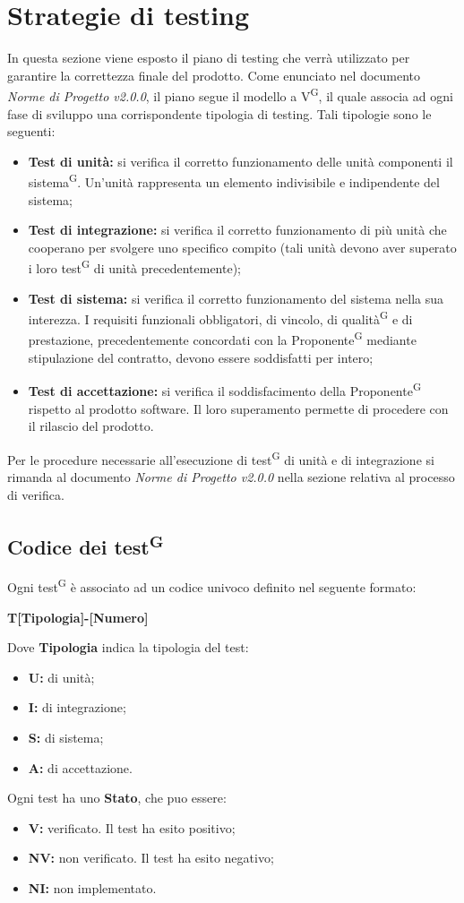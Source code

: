 \documentclass[8pt]{article}
\newcommand{\glossterm}[1]{#1\textsuperscript{G}} %
\begin{document}
\section{Strategie di testing}\label{sec:strategie testing}
In questa sezione viene esposto il piano di testing che verrà utilizzato per garantire la correttezza finale del prodotto. Come enunciato nel documento \textit{Norme di Progetto v2.0.0}, il piano segue il \glossterm{modello a V}, il quale associa ad ogni fase di sviluppo una corrispondente tipologia di testing. Tali tipologie sono le seguenti:
\begin{itemize}
	\item \textbf{Test di unità:} si verifica il corretto funzionamento delle unità componenti il \glossterm{sistema}. Un'unità rappresenta un elemento indivisibile e indipendente del sistema; 
	\item \textbf{Test di integrazione:} si verifica il corretto funzionamento di più unità che cooperano per svolgere uno specifico compito (tali unità devono aver superato i loro \glossterm{test} di unità precedentemente);
	\item \textbf{Test di sistema:} si verifica il corretto funzionamento del sistema nella sua interezza. I requisiti funzionali obbligatori, di vincolo, di \glossterm{qualità} e di prestazione, precedentemente concordati con la \glossterm{Proponente} mediante stipulazione del contratto, devono essere soddisfatti per intero;
	\item \textbf{Test di accettazione:} si verifica il soddisfacimento della \glossterm{Proponente} rispetto al prodotto software. Il loro superamento permette di procedere con il rilascio del prodotto.
\end{itemize}
Per le procedure necessarie all’esecuzione di \glossterm{test} di unità e di integrazione si rimanda al documento \textit{Norme di Progetto v2.0.0} nella sezione relativa al processo di verifica.
\subsection{Codice dei \glossterm{test}}
Ogni \glossterm{test} è associato ad un codice univoco definito nel seguente formato:
\begin{center}
	\textbf{T[Tipologia]-[Numero]}
\end{center}
Dove \textbf{Tipologia} indica la tipologia del test: 
\begin{itemize}
    \item \textbf{U:} di unit\`{a};
	\item \textbf{I:} di integrazione;
	\item \textbf{S:} di sistema;
	\item \textbf{A:} di accettazione.
\end{itemize}
Ogni test ha uno \textbf{Stato}, che puo essere:
\begin{itemize}
	\item \textbf{V:} verificato. Il test ha esito positivo;
	\item \textbf{NV:} non verificato. Il test ha esito negativo; 
	\item \textbf{NI:} non implementato.
\end{itemize}
\clearpage
\end{document}
